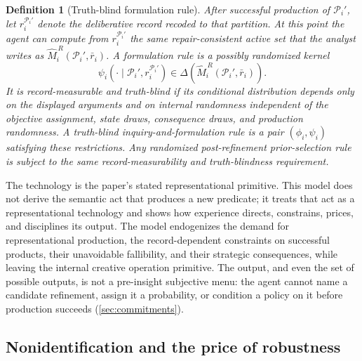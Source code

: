 \documentclass[11pt]{article}
\newtheorem{definition}[assumption]{Definition}
\theoremstyle{definition}
\begin{document}
\begin{definition}[Truth-blind formulation rule]
\label{def:formulation-rule}
After successful production of $\mathcal P_i'$, let $r_i^{\mathcal P_i'}$ denote the deliberative record recoded to that partition.
At this point the agent can compute from $r_i^{\mathcal P_i'}$ the same repair-consistent active set that the analyst writes as $\widehat M_i^{\,R}(\mathcal P_i',\bar r_i)$.
A \emph{formulation rule} is a possibly randomized kernel
\[
\psi_i\!\left(
\cdot\mid\mathcal P_i',r_i^{\mathcal P_i'}
\right)
\in
\Delta\!\left(
\widehat M_i^{\,R}(\mathcal P_i',\bar r_i)
\right).
\]
It is \emph{record-measurable and truth-blind} if its conditional distribution depends only on the displayed arguments and on internal randomness independent of the objective assignment, state draws, consequence draws, and production randomness.
A \emph{truth-blind inquiry-and-formulation rule} is a pair $(\phi_i,\psi_i)$ satisfying these restrictions.
Any randomized post-refinement prior-selection rule is subject to the same record-measurability and truth-blindness requirement.
\end{definition}

The technology is the paper's stated representational primitive.
This model does not derive the semantic act that produces a new predicate; it treats that act as a representational technology and shows how experience directs, constrains, prices, and disciplines its output.
The model endogenizes the demand for representational production, the record-dependent constraints on successful products, their unavoidable fallibility, and their strategic consequences, while leaving the internal creative operation primitive.
The output, and even the set of possible outputs, is not a pre-insight subjective menu: the agent cannot name a candidate refinement, assign it a probability, or condition a policy on it before production succeeds (\cref{sec:commitments}).

\subsection{Nonidentification and the price of robustness}
\end{document}
